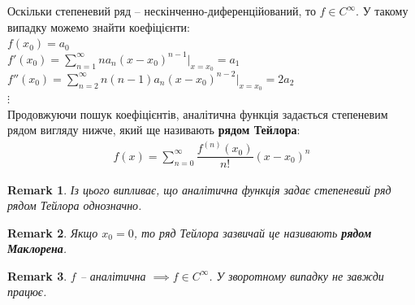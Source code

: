 \documentclass[a4paper, 10pt]{article}
\makeatletter
\def\huge{\displaystyle}
\theoremstyle{theoremdd}
\newtheorem{theorem}{Theorem}[subsection]
\theoremstyle{theoremdd}
\theoremstyle{theoremdd}
\theoremstyle{theoremdd}
\theoremstyle{theoremdd}
\theoremstyle{theoremdd}
\theoremstyle{theoremdd}
\newtheorem{remark}[theorem]{Remark}
\theoremstyle{theoremdd}
\theoremstyle{theoremdd}
\renewenvironment{proof}[1][Proof.\\]{\par
\pushQED{\hfill \qed}%
\normalfont \topsep6\p@\@plus6\p@\relax
\trivlist
\item\relax
{\bfseries
#1\@addpunct{.}}\hspace\labelsep\ignorespaces
}{%
\popQED\endtrivlist\@endpefalse
}
\makeatother
\begin{document}
Оскільки степеневий ряд -- нескінченно-диференційований, то $f \in C^\infty$. У такому випадку можемо знайти коефіцієнти:\\
$f(x_0) = a_0$\\
$f'(x_0) = \huge\sum_{n=1}^\infty n a_n(x-x_0)^{n-1} |_{x=x_0} = a_1$\\
$f''(x_0) = \huge\sum_{n=2}^\infty n(n-1) a_n(x-x_0)^{n-2} |_{x=x_0} = 2a_2$\\
$\vdots$\\
Продовжуючи пошук коефіцієнтів, аналітична функція задається степеневим рядом вигляду нижче, який ще називають \textbf{рядом Тейлора}:
\begin{align*}
f(x) = \huge\sum_{n=0}^\infty \dfrac{f^{(n)}(x_0)}{n!}(x-x_0)^n
\end{align*}

\begin{remark}
Із цього випливає, що аналітична функція задає степеневий ряд рядом Тейлора однозначно.
\end{remark}

\begin{remark}
Якщо $x_0 = 0$, то ряд Тейлора зазвичай це називають \textbf{рядом Маклорена}.
\end{remark}

\begin{remark}
$f$ -- аналітична $\implies f \in C^\infty$. У зворотному випадку не завжди працює.
\end{remark}
\end{document}
